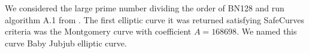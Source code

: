 \documentclass{article}
\begin{document}
\begin{spacing}{1.2}
	We considered the large prime number dividing the order of BN128 and run algorithm A.1 from \cite{generation-baby}. The first elliptic curve it was returned  satisfying SafeCurves criteria was the Montgomery curve with coefficient $A = 168698$. We named this curve Baby Jubjub elliptic curve.  
%	
%	
%	

\end{spacing}
\end{document}
